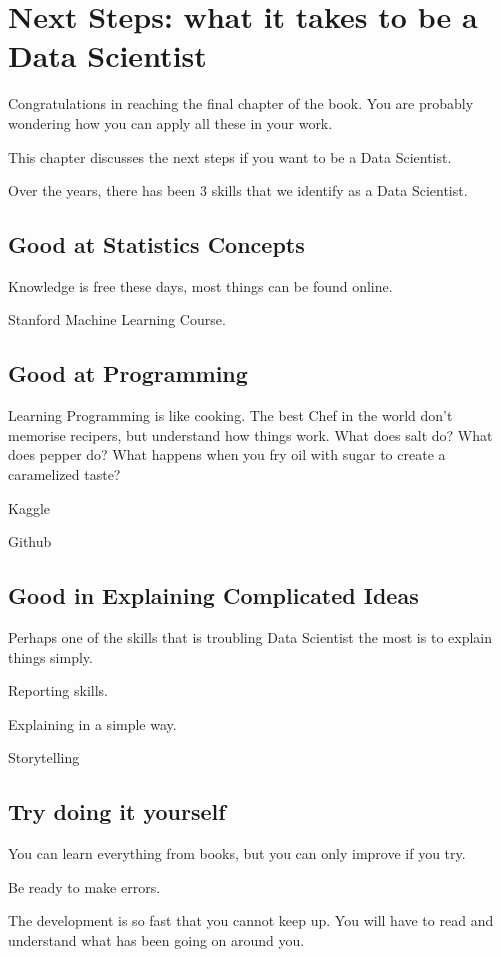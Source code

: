 \section{Next Steps: what it takes to be a Data Scientist}

Congratulations in reaching the final chapter of the book.  You are probably wondering how you can apply all these in your work.  

This chapter discusses the next steps if you want to be a Data Scientist.  

Over the years, there has been 3 skills that we identify as a Data Scientist.

\subsection{Good at Statistics Concepts}

Knowledge is free these days, most things can be found online.  

Stanford Machine Learning Course.  

\subsection{Good at Programming}

Learning Programming is like cooking.  The best Chef in the world don't memorise recipers, but understand how things work.  What does salt do?  What does pepper do?  What happens when you fry oil with sugar to create a caramelized taste?

Kaggle

Github

\subsection{Good in Explaining Complicated Ideas}

Perhaps one of the skills that is troubling Data Scientist the most is to explain things simply.  

Reporting skills.

Explaining in a simple way.  

Storytelling

\subsection{Try doing it yourself}

You can learn everything from books, but you can only improve if you try.  

Be ready to make errors.  

The development is so fast that you cannot keep up.  You will have to read and understand what has been going on around you.  

\newpage